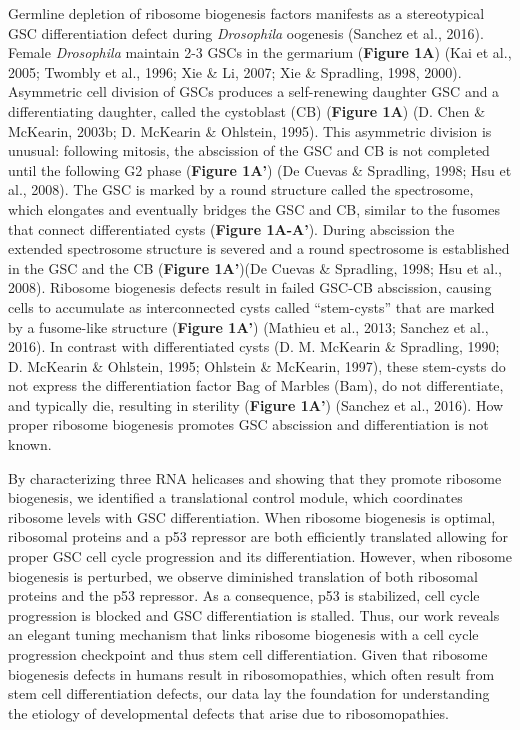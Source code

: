 \documentclass[12pt,oneside]{reedthesis}
\begin{document}
Germline depletion of ribosome biogenesis factors manifests as a stereotypical GSC differentiation defect during \emph{Drosophila} oogenesis (Sanchez et al., 2016). Female \emph{Drosophila} maintain 2-3 GSCs in the germarium (\textbf{Figure 1A}) (Kai et al., 2005; Twombly et al., 1996; Xie \& Li, 2007; Xie \& Spradling, 1998, 2000). Asymmetric cell division of GSCs produces a self-renewing daughter GSC and a differentiating daughter, called the cystoblast (CB) (\textbf{Figure 1A}) (D. Chen \& McKearin, 2003b; D. McKearin \& Ohlstein, 1995). This asymmetric division is unusual: following mitosis, the abscission of the GSC and CB is not completed until the following G2 phase (\textbf{Figure 1A'}) (De Cuevas \& Spradling, 1998; Hsu et al., 2008). The GSC is marked by a round structure called the spectrosome, which elongates and eventually bridges the GSC and CB, similar to the fusomes that connect differentiated cysts (\textbf{Figure 1A-A'}). During abscission the extended spectrosome structure is severed and a round spectrosome is established in the GSC and the CB (\textbf{Figure 1A'})(De Cuevas \& Spradling, 1998; Hsu et al., 2008). Ribosome biogenesis defects result in failed GSC-CB abscission, causing cells to accumulate as interconnected cysts called ``stem-cysts'' that are marked by a fusome-like structure (\textbf{Figure 1A'}) (Mathieu et al., 2013; Sanchez et al., 2016). In contrast with differentiated cysts (D. M. McKearin \& Spradling, 1990; D. McKearin \& Ohlstein, 1995; Ohlstein \& McKearin, 1997), these stem-cysts do not express the differentiation factor Bag of Marbles (Bam), do not differentiate, and typically die, resulting in sterility (\textbf{Figure 1A'}) (Sanchez et al., 2016). How proper ribosome biogenesis promotes GSC abscission and differentiation is not known.

By characterizing three RNA helicases and showing that they promote ribosome biogenesis, we identified a translational control module, which coordinates ribosome levels with GSC differentiation. When ribosome biogenesis is optimal, ribosomal proteins and a p53 repressor are both efficiently translated allowing for proper GSC cell cycle progression and its differentiation. However, when ribosome biogenesis is perturbed, we observe diminished translation of both ribosomal proteins and the p53 repressor. As a consequence, p53 is stabilized, cell cycle progression is blocked and GSC differentiation is stalled. Thus, our work reveals an elegant tuning mechanism that links ribosome biogenesis with a cell cycle progression checkpoint and thus stem cell differentiation. Given that ribosome biogenesis defects in humans result in ribosomopathies, which often result from stem cell differentiation defects, our data lay the foundation for understanding the etiology of developmental defects that arise due to ribosomopathies.
\end{document}
